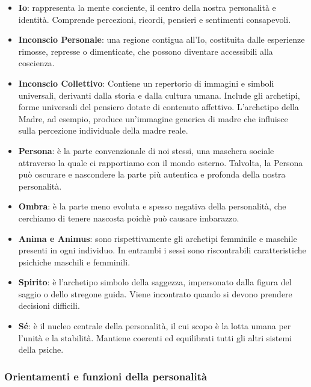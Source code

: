 \documentclass{subfiles}\
\begin{document}
\begin{itemize}
    \item \textbf{Io}: rappresenta la mente cosciente, il centro della nostra personalità e identità. 
    Comprende percezioni, ricordi, pensieri e sentimenti consapevoli.
    
    \item \textbf{Inconscio Personale}: una regione contigua all'Io, costituita dalle esperienze 
    rimosse, represse o dimenticate, che possono diventare accessibili alla coscienza. 
    
    \item \textbf{Inconscio Collettivo}: Contiene un repertorio di immagini e simboli 
    universali, derivanti dalla storia e dalla cultura umana. Include gli archetipi, forme 
    universali del pensiero dotate di contenuto affettivo. L'archetipo della Madre, ad esempio, 
    produce un'immagine generica di madre che influisce sulla percezione individuale della madre reale.

    \item \textbf{Persona}: è la parte convenzionale di noi stessi, una maschera sociale attraverso 
    la quale ci rapportiamo con il mondo esterno. Talvolta, la Persona può oscurare e nascondere 
    la parte più autentica e profonda della nostra personalità.

    \item \textbf{Ombra}: è la parte meno evoluta e spesso negativa della personalità, che 
    cerchiamo di tenere nascosta poichè può causare imbarazzo.

    \item \textbf{Anima e Animus}: sono rispettivamente gli archetipi femminile e maschile 
    presenti in ogni individuo. In entrambi i sessi sono riscontrabili caratteristiche psichiche 
    maschili e femminili.

    \item \textbf{Spirito}: è l'archetipo simbolo della saggezza, impersonato dalla figura 
    del saggio o dello stregone guida. Viene incontrato quando si devono prendere decisioni 
    difficili.

    \item \textbf{Sé}: è il nucleo centrale della personalità, il cui scopo è la lotta umana 
    per l'unità e la stabilità. Mantiene coerenti ed equilibrati tutti gli altri sistemi della psiche.
\end{itemize}

\subsubsection{Orientamenti e funzioni della personalità}
\end{document}
